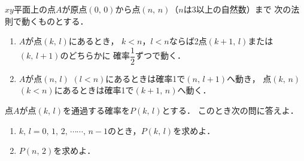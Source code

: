 \documentclass[../../main.tex]{subfiles}
\begin{document}
$xy$平面上の点$A$が原点$(0, \, 0)$から点$(n, \, n)$（$n$は3以上の自然数）まで
次の法則で動くものとする．
\begin{enumerate}
  \item $A$が点$(k, \, l)$にあるとき，
    $k<n$，$l<n$ならば2点$(k+1, \, l)$または$(k, \, l+1)$のどちらかに
    確率$\displaystyle\dfrac{1}{2}$ずつで動く．
  \item $A$が点$(n, \, l)$ $(l<n)$にあるときは確率1で$(n, \, l+1)$へ動き，
    点$(k, \, n)$ $(k<n)$にあるときは確率1で$(k+1, \, n)$へ動く．
\end{enumerate}
点$A$が点$(k, \, l)$を通過する確率を$P(k, \, l)$とする．
このとき次の問に答えよ．
\begin{enumerate}
  \item $k, \, l=0, \, 1, \, 2, \, \cdots\cdots, \, n-1$のとき，$P(k, \, l)$を求めよ．
  \item $P(n, \, 2)$を求めよ．
\end{enumerate}
\end{document}
